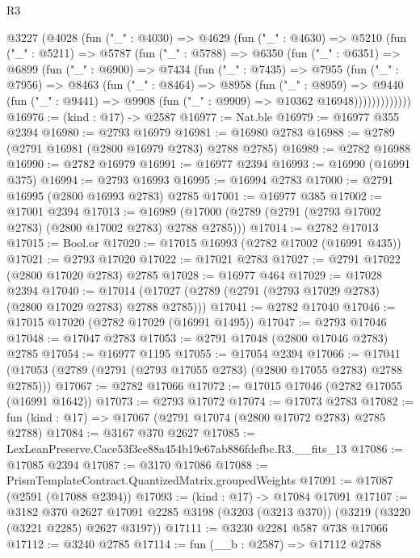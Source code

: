 \begin{lexlean}{R3}
\begin{coremodule}
  @3227
    (@4028
      (fun ("_" : @4030) =>
      @4629
        (fun ("_" : @4630) =>
        @5210
          (fun ("_" : @5211) =>
          @5787
            (fun ("_" : @5788) =>
            @6350
              (fun ("_" : @6351) =>
              @6899
                (fun ("_" : @6900) =>
                @7434
                  (fun ("_" : @7435) =>
                  @7955
                    (fun ("_" : @7956) =>
                    @8463
                      (fun ("_" : @8464) =>
                      @8958
                        (fun ("_" : @8959) =>
                        @9440
                          (fun ("_" : @9441) =>
                          @9908 (fun ("_" : @9909) => @10362 @16948)))))))))))))
@16976 := (kind : @17) -> @2587
@16977 := Nat.ble
@16979 := @16977 @355 @2394
@16980 := @2793 @16979
@16981 := @16980 @2783
@16988 := @2789 (@2791 @16981 (@2800 @16979 @2783) @2788 @2785)
@16989 := @2782 @16988
@16990 := @2782 @16979
@16991 := @16977 @2394
@16993 := @16990 (@16991 @375)
@16994 := @2793 @16993
@16995 := @16994 @2783
@17000 := @2791 @16995 (@2800 @16993 @2783) @2785
@17001 := @16977 @385
@17002 := @17001 @2394
@17013 := @16989 (@17000 (@2789 (@2791 (@2793 @17002 @2783) (@2800 @17002 @2783) @2788 @2785)))
@17014 := @2782 @17013
@17015 := Bool.or
@17020 := @17015 @16993 (@2782 @17002 (@16991 @435))
@17021 := @2793 @17020
@17022 := @17021 @2783
@17027 := @2791 @17022 (@2800 @17020 @2783) @2785
@17028 := @16977 @464
@17029 := @17028 @2394
@17040 := @17014 (@17027 (@2789 (@2791 (@2793 @17029 @2783) (@2800 @17029 @2783) @2788 @2785)))
@17041 := @2782 @17040
@17046 := @17015 @17020 (@2782 @17029 (@16991 @1495))
@17047 := @2793 @17046
@17048 := @17047 @2783
@17053 := @2791 @17048 (@2800 @17046 @2783) @2785
@17054 := @16977 @1195
@17055 := @17054 @2394
@17066 := @17041 (@17053 (@2789 (@2791 (@2793 @17055 @2783) (@2800 @17055 @2783) @2788 @2785)))
@17067 := @2782 @17066
@17072 := @17015 @17046 (@2782 @17055 (@16991 @1642))
@17073 := @2793 @17072
@17074 := @17073 @2783
@17082 := fun (kind : @17) => @17067 (@2791 @17074 (@2800 @17072 @2783) @2785 @2788)
@17084 := @3167 @370 @2627
@17085 := LexLeanPreserve.Cace53f3ce88a454b19e67ab886fdefbc.R3.__fits_13
@17086 := @17085 @2394
@17087 := @3170 @17086
@17088 := PrismTemplateContract.QuantizedMatrix.groupedWeights
@17091 := @17087 (@2591 (@17088 @2394))
@17093 := (kind : @17) -> @17084 @17091
@17107 := @3182
    @370
    @2627
    @17091
    @2285
    @3198
    (@3203 (@3213 @370))
    (@3219 (@3220 (@3221 @2285) @2627 @3197))
@17111 := @3230 @2281 @587 @738 @17066
@17112 := @3240 @2785
@17114 := fun (__b : @2587) => @17112 @2788

\end{coremodule}
\end{lexlean}
